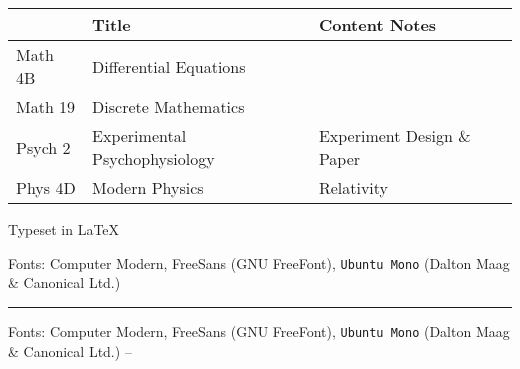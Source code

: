 \begin{tabular}{l l l}
\hline
 & Title & Content Notes \\
\hline
\rowcolor{oddColor} Math 4B & Differential Equations & \\
\rowcolor{oddColor} Math 19 & Discrete Mathematics & \\
\rowcolor{oddColor}
Psych 2 & Experimental Psychophysiology & Experiment Design \& Paper \\
\rowcolor{oddColor} Phys 4D & Modern Physics & Relativity \\
\hline
\end{tabular}
\vfill
{
\begin{center}
\color{gray}
Typeset in \LaTeX\

Fonts: Computer Modern, \textsf{FreeSans} (GNU FreeFont),
\texttt{Ubuntu Mono} (Dalton Maag \& Canonical Ltd.)
\end{center}
}
\fi %
\ifdefined\RESUME
\vfill
\hrule
\vfill
{
\color{gray}
Fonts: Computer Modern, \textsf{FreeSans} (GNU FreeFont),
\texttt{Ubuntu Mono} (Dalton Maag \& Canonical Ltd.)
}
 -- 
\vfill
\fi %


